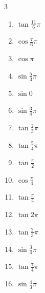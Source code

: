 \begin{multicols}{3}
\begin{enumerate}
  \item $\displaystyle \tan{\frac{11}{6}\pi}$

  \item $\displaystyle \cos{\frac{7}{6}\pi}$

  \item $\displaystyle \cos{\pi}$
        \phantom{$\displaystyle =-1$}

  \item $\displaystyle \sin{\frac{5}{3}\pi}$

  \item $\displaystyle \sin{0}$
        \phantom{$\displaystyle =0$}

  \item $\displaystyle \sin{\frac{3}{4}\pi}$

  \item $\displaystyle \tan{\frac{2}{3}\pi}$

  \item $\displaystyle \tan{\frac{5}{4}\pi}$
        \phantom{$\displaystyle =1$}

  \item $\displaystyle \tan{\frac{\pi}{2}}$
        \phantom{$\displaystyle \quad なし$}

  \item $\displaystyle \cos{\frac{\pi}{4}}$

  \item $\displaystyle \tan{\frac{\pi}{4}}$
        \phantom{$\displaystyle =1$}

  \item $\displaystyle \tan{2\pi}$
        \phantom{$\displaystyle =0$}

  \item $\displaystyle \tan{\frac{2}{3}\pi}$

  \item $\displaystyle \sin{\frac{3}{4}\pi}$

  \item $\displaystyle \tan{\frac{7}{4}\pi}$
        \phantom{$\displaystyle =-1$}

  \item $\displaystyle \sin{\frac{4}{3}\pi}$


\end{enumerate}
\end{multicols}
